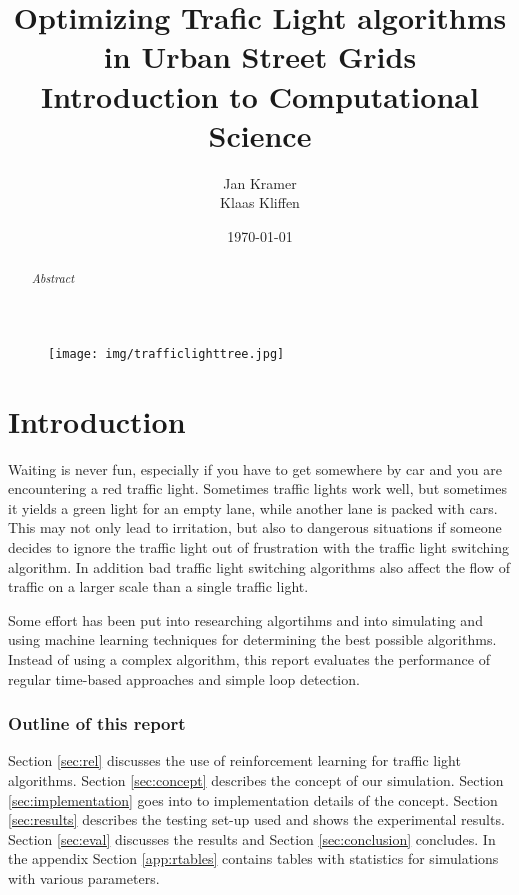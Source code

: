 \documentclass[a4paper,11pt]{article}
\title{Optimizing Trafic Light algorithms in Urban Street Grids\\
\large Introduction to Computational Science}
\author{Jan Kramer\\Klaas Kliffen}
\date{\today}
\begin{document}
\begin{titlepage}
\maketitle
\thispagestyle{empty}
\begin{abstract}
\textit{
 Abstract
}
\end{abstract}
\medskip\medskip
\begin{figure}[H]
  \centering
  \texttt{[image: img/trafficlighttree.jpg]}
\end{figure}


\end{titlepage}

\newpage
\tableofcontents

\newpage

\section{Introduction}
Waiting is never fun, especially if you have to get somewhere by car and you are encountering a red traffic light.
Sometimes traffic lights work well, but sometimes it yields a green light for an empty lane, while another lane is packed with cars.
This may not only lead to irritation, but also to dangerous situations if someone decides to ignore the traffic light out of frustration with the traffic light switching algorithm.
In addition bad traffic light switching algorithms also affect the flow of traffic on a larger scale than a single traffic light.

Some effort has been put into researching algortihms and into simulating and using machine learning techniques for determining the best possible algorithms.
Instead of using a complex algorithm, this report evaluates the performance of regular time-based approaches and simple loop detection.

\subsubsection*{Outline of this report}
Section \ref{sec:rel} discusses the use of reinforcement learning for traffic light algorithms.
Section \ref{sec:concept} describes the concept of our simulation.
Section \ref{sec:implementation} goes into to implementation details of the concept.
Section \ref{sec:results} describes the testing set-up used and shows the experimental results.
Section \ref{sec:eval} discusses the results and Section \ref{sec:conclusion} concludes.
In the appendix Section \ref{app:rtables} contains tables with statistics for simulations with various parameters.
\end{document}
